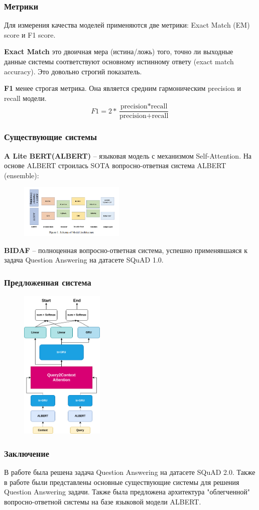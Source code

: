 \documentclass[xcolor={dvipsnames}]{beamer}
\begin{document}
\begin{frame}
\frametitle{Метрики}
Для измерения качества моделей применяются две метрики: Exact Match (EM) score и F1
score.

\textbf{Exact Match} это двоичная мера (истина/ложь) того, точно ли выходные данные системы соответствуют
основному истинному ответу (exact match accuracy). Это довольно строгий показатель.

\textbf{F1} менее строгая метрика. Она является средним гармоническим precision и recall модели. \\
$$F1 = 2*\frac{\text{precision}*\text{recall}}{\text{precision} + \text{recall}}$$
\end{frame}

\begin{frame}
\frametitle{Существующие системы}
\textbf{A Lite BERT(ALBERT)} -- языковая модель с механизмом Self-Attention. На основе ALBERT строилась SOTA вопросно-ответная система ALBERT (ensemble):

\begin{figure}[!ht]
    \centering
    \includegraphics[width=50mm]{../figures/ALBERTsquad.png}
\end{figure}

\textbf{BIDAF} -- полноценная вопросно-ответная система, успешно применявшаяся к задача Question Answering на датасете SQuAD 1.0.
\end{frame}

\begin{frame}
\frametitle{Предложенная система}
\begin{figure}[!ht]
    \centering
    \includegraphics[width=40mm]{../figures/model_diagram.drawio.png}
\end{figure}
\end{frame}

\begin{frame}
\frametitle{Заключение}
В работе была решена задача Question Answering на датасете SQuAD 2.0. Также в работе были представлены основные существующие системы для решения Question Answering задачи. Также была предложена архитектура "облегченной" вопросно-ответной системы на базе языковой модели ALBERT.
\end{frame}
\end{document}

